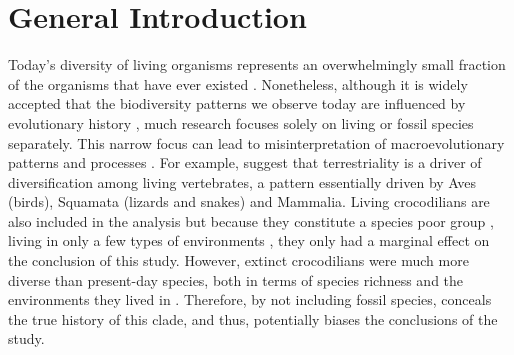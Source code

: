 \chapter{General Introduction}
\label{chap:introduction}




%
% 

Today's diversity of living organisms represents an overwhelmingly small fraction of the organisms that have ever existed \citep{novacek1992ext,raup1993extinction}.
Nonetheless, although it is widely accepted that the biodiversity patterns %
we observe today are influenced by evolutionary history \citep{simpson1945,Gingerich1987,archibald2011extinction}, much research focuses solely on living or fossil species separately.
This narrow focus can lead to misinterpretation of macroevolutionary patterns and processes \citep{fritzdiversity2013,benton2015}.
For example, \cite{Wiens2015} suggest that terrestriality is a driver of diversification among living vertebrates, a pattern essentially driven by Aves (birds), Squamata (lizards and snakes) and Mammalia. 
Living crocodilians are also included in the analysis but because they constitute a species poor group \citep[25 species;][]{uetz2010original}, living in only a few types of environments \citep[marine or freshwater;][]{Martin2008}, they only had a marginal effect on the conclusion of this study.
However, extinct crocodilians were much more diverse than present-day species, both in terms of species richness \citep[at least 244 species are reported in][]{Bronzati2015} and the environments they lived in \citep[extinct crocodilians species ranged from fully marine ones to fully terrestrial ones -- including even few tree-dwelling! --][]{stubbs2013}.
Therefore, by not including fossil species, \cite{Wiens2015} conceals the true history of this clade, and thus, potentially biases the conclusions of the study.

